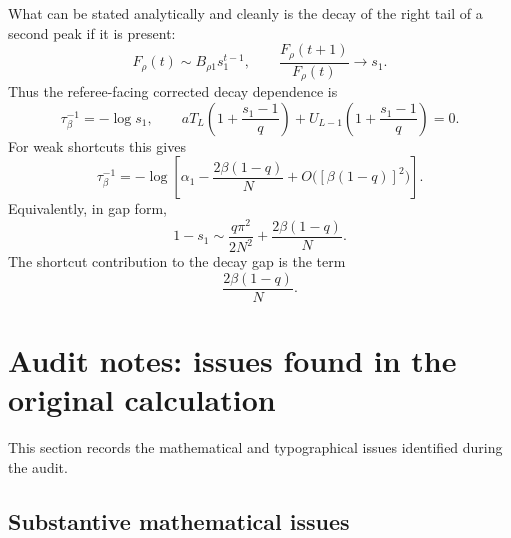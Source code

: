 \documentclass[11pt]{article}
\begin{document}
What can be stated analytically and cleanly is the decay of the right tail of a second peak if it
is present:
\begin{equation}
  \boxed{F_\rho(t)\sim B_{\rho1}s_1^{t-1},
  \qquad \frac{F_\rho(t+1)}{F_\rho(t)}\to s_1.}
\end{equation}
Thus the referee-facing corrected decay dependence is
\begin{equation}
  \boxed{\tau_\beta^{-1}=-\log s_1,\qquad
  aT_L\left(1+\frac{s_1-1}{q}\right)+U_{L-1}\left(1+\frac{s_1-1}{q}\right)=0.}
\end{equation}
For weak shortcuts this gives
\begin{equation}
  \boxed{\tau_\beta^{-1}
  =-\log\left[\alpha_1-\frac{2\beta(1-q)}{N}+O\bigl([\beta(1-q)]^2\bigr)\right].}
\end{equation}
Equivalently, in gap form,
\begin{equation}
  \boxed{1-s_1\sim \frac{q\pi^2}{2N^2}+\frac{2\beta(1-q)}{N}.}
\end{equation}
The shortcut contribution to the decay gap is the term
\begin{equation}
  \boxed{\frac{2\beta(1-q)}{N}.}
\end{equation}

\section{Audit notes: issues found in the original calculation}
\label{sec:audit-notes}

This section records the mathematical and typographical issues identified during the audit.

\subsection{Substantive mathematical issues}
\end{document}
